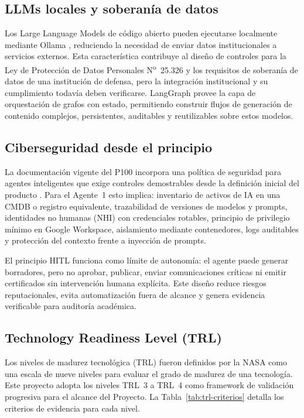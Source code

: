 \documentclass[a4paper, 12pt]{article}
\begin{document}
\subsection{LLMs locales y soberan\'ia de datos}

Los Large Language Models de c\'odigo abierto pueden ejecutarse localmente mediante Ollama \parencite{ollama2024}, reduciendo la necesidad de enviar datos institucionales a servicios externos. Esta caracter\'istica contribuye al dise\~no de controles para la Ley de Protecci\'on de Datos Personales N\textsuperscript{o}~25.326 \parencite{ley25326} y los requisitos de soberan\'ia de datos de una instituci\'on de defensa, pero la integraci\'on institucional y su cumplimiento todav\'ia deben verificarse. LangGraph \parencite{langgraph2026} provee la capa de orquestaci\'on de grafos con estado, permitiendo construir flujos de generaci\'on de contenido complejos, persistentes, auditables y reutilizables sobre estos modelos.

\subsection{Ciberseguridad desde el principio}

La documentaci\'on vigente del \ac{P100} incorpora una pol\'itica de seguridad para agentes inteligentes que exige controles demostrables desde la definici\'on inicial del producto \parencite{cicerchia2026procesos}. Para el Agente~1 esto implica: inventario de activos de IA en una \ac{CMDB} o registro equivalente, trazabilidad de versiones de modelos y prompts, identidades no humanas (\ac{NHI}) con credenciales rotables, principio de privilegio m\'inimo en Google Workspace, aislamiento mediante contenedores, logs auditables y protecci\'on del contexto frente a inyecci\'on de prompts.

El principio \ac{HITL} funciona como l\'imite de autonom\'ia: el agente puede generar borradores, pero no aprobar, publicar, enviar comunicaciones cr\'iticas ni emitir certificados sin intervenci\'on humana expl\'icita. Este dise\~no reduce riesgos reputacionales, evita automatizaci\'on fuera de alcance y genera evidencia verificable para auditor\'ia acad\'emica.

\subsection{Technology Readiness Level (TRL)}

Los niveles de madurez tecnol\'ogica (\ac{TRL}) fueron definidos por la NASA \parencite{mankins1995} como una escala de nueve niveles para evaluar el grado de madurez de una tecnolog\'ia. Este proyecto adopta los niveles TRL~3 a TRL~4 como framework de validaci\'on progresiva para el alcance del Proyecto. La Tabla~\ref{tab:trl-criterios} detalla los criterios de evidencia para cada nivel.
\end{document}
